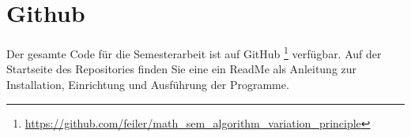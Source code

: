 %
%
%
%
\section{Github 
\label{beispiel:section:teil5}}

Der gesamte Code für die Semesterarbeit ist auf GitHub 
\footnote{\url{https://github.com/feiler/math_sem_algorithm_variation_principle}}
\cite{algorythm:repo} verfügbar. 
Auf der Startseite des Repositories finden Sie eine ein ReadMe als Anleitung zur 
Installation, Einrichtung und Ausführung der Programme.